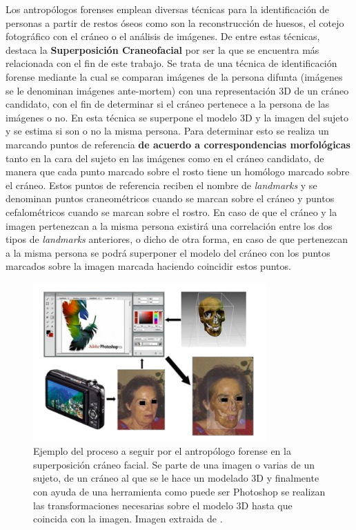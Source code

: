 \noindent Los antropólogos forenses emplean diversas técnicas para la identificación de personas a partir de restos óseos como son la reconstrucción de huesos, el cotejo fotográfico con el cráneo o el análisis de imágenes. De entre estas técnicas, destaca la \textbf{Superposición Craneofacial} por ser la que se encuentra más relacionada con el fin de este trabajo. Se trata de una técnica de identificación forense mediante la cual se comparan imágenes de la persona difunta (imágenes se le denominan imágenes ante-mortem) con una representación 3D de un cráneo candidato, con el fin de determinar si el cráneo pertenece a la persona de las imágenes o no. En esta técnica se superpone el modelo 3D y la imagen del sujeto y se estima si son o no la misma persona. Para determinar esto se realiza un marcando puntos de referencia \textbf{de acuerdo a correspondencias morfológicas} tanto en la cara del sujeto en las imágenes como en el cráneo candidato, de manera que cada punto marcado sobre el rosto tiene un homólogo marcado sobre el cráneo. Estos puntos de referencia reciben el nombre de \textit{landmarks} y se denominan puntos craneométricos cuando se marcan sobre el cráneo y puntos cefalométricos cuando se marcan sobre el rostro. En caso de que el cráneo y la imagen pertenezcan a la misma persona existirá una correlación entre los dos tipos de \textit{landmarks} anteriores, o dicho de otra forma, en caso de que pertenezcan a la misma persona se podrá superponer el modelo del cráneo con los puntos marcados sobre la imagen marcada haciendo coincidir estos puntos.

\begin{figure}[!h]
    \centering
    \includegraphics[width=0.8\textwidth]{img/ejemplo_SCF_intro.png}
    \caption{Ejemplo del proceso a seguir por el antropólogo forense en la superposición cráneo facial. Se parte de una imagen o varias de un sujeto, de un cráneo al que se le hace un modelado 3D y finalmente con ayuda de una herramienta como puede ser Photoshop se realizan las transformaciones necesarias sobre el modelo 3D hasta que coincida con la imagen. Imagen extraida de \cite{damas2020handbook}.}
\end{figure}


